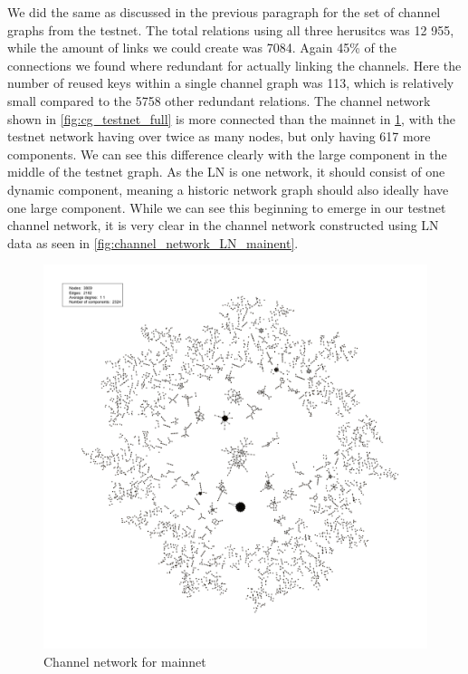 We did the same as discussed in the previous paragraph for the set of channel graphs from the testnet. The total relations using all three herusitcs was 12 955, while the amount of links we could create was 7084. Again 45\% of the connections we found where redundant for actually linking the channels. Here the number of reused keys within a single channel graph was 113, which is relatively small compared to the 5758 other redundant relations.
The channel network shown in \cref{fig:cg_testnet_full} is more connected than the mainnet in \cref{fig:cg_mainnet_full}, with the testnet network having over twice as many nodes, but only having 617 more components. We can see this difference clearly with the large component in the middle of the testnet graph. As the LN is one network, it should consist of one dynamic component, meaning a historic network graph should also ideally have one large component. While we can see this beginning to emerge in our testnet channel network, it is very clear in the channel network constructed using LN data as seen in \cref{fig:channel_network_LN_mainent}.
\\

\begin{figure}[ht]
    \centering
    \includegraphics[width=13cm]{figures/graphs/cg_bc_mainnet_full.png}
    \caption{Channel network for mainnet}
    \label{fig:cg_mainnet_full}
\end{figure}

